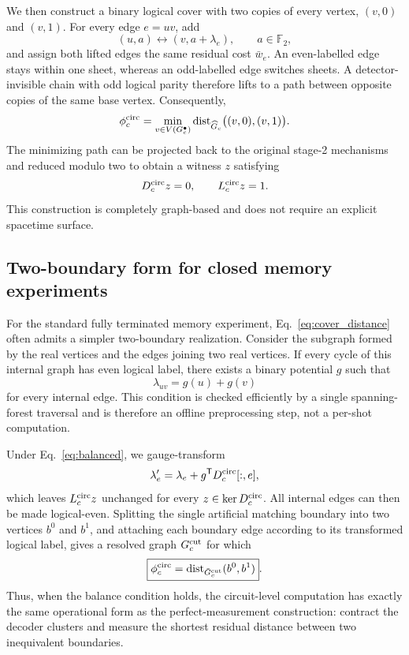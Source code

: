 \documentclass[10pt,twocolumn]{article}
\newcommand{\F}{\mathbb F_2}
\begin{document}
We then construct a binary logical cover with two copies of every vertex,
\((v,0)\) and \((v,1)\).  For every edge \(e=uv\), add
\[
 (u,a)\longleftrightarrow(v,a+\lambda_e),
 \qquad a\in\F,
 \label{eq:cover_edge}
\]
and assign both lifted edges the same residual cost \(\bar w_e\).  An
even-labelled edge stays within one sheet, whereas an odd-labelled edge
switches sheets.  A detector-invisible chain with odd logical parity therefore
lifts to a path between opposite copies of the same base vertex.  Consequently,
\[
 \phi_c^{\rm circ}
 =
 \min_{v\in V(G_c^\bullet)}
 \operatorname{dist}_{\widehat G_c}\bigl((v,0),(v,1)\bigr).
 \label{eq:cover_distance}
\]
The minimizing path can be projected back to the original stage-2 mechanisms
and reduced modulo two to obtain a witness \(z\) satisfying
\[
 D_c^{\rm circ}z=0,\qquad
 L_c^{\rm circ}z=1.
\]
This construction is completely graph-based and does not require an explicit
spacetime surface.

\subsection{Two-boundary form for closed memory experiments}

For the standard fully terminated memory experiment, Eq.~\eqref{eq:cover_distance}
often admits a simpler two-boundary realization.  Consider the subgraph
formed by the real vertices and the edges joining two real vertices.  If
every cycle of this internal graph has even logical label, there exists a
binary potential \(g\) such that
\[
 \lambda_{uv}=g(u)+g(v)
 \label{eq:balanced}
\]
for every internal edge.  This condition is checked efficiently by a single
spanning-forest traversal and is therefore an offline preprocessing step,
not a per-shot computation.

Under Eq.~\eqref{eq:balanced}, we gauge-transform
\[
 \lambda'_e
 =
 \lambda_e + g^{\mathsf T}D_c^{\rm circ}[:,e],
\]
which leaves \(L_c^{\rm circ}z\) unchanged for every
\(z\in\ker D_c^{\rm circ}\).  All internal edges can then be made
logical-even.  Splitting the single artificial matching boundary into two
vertices \(b^0\) and \(b^1\), and attaching each boundary edge according to
its transformed logical label, gives a resolved graph
\(G_c^{\rm cut}\) for which
\[
 \boxed{
 \phi_c^{\rm circ}
 =
 \operatorname{dist}_{\bar G_c^{\rm cut}}(b^0,b^1)
 }.
 \label{eq:two_boundary}
\]
Thus, when the balance condition holds, the circuit-level computation has
exactly the same operational form as the perfect-measurement construction:
contract the decoder clusters and measure the shortest residual distance
between two inequivalent boundaries.
\end{document}
